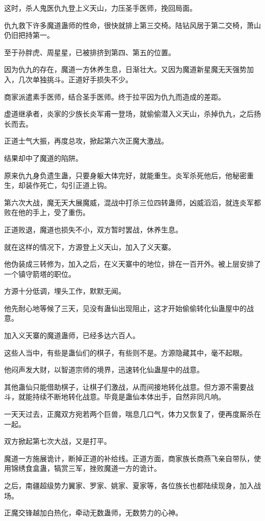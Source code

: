 \begin{this_body}
这时，杀人鬼医仇九登上义天山，力压圣手医师，挽回局面。

仇九救下许多魔道蛊师的性命，很快就排上第三交椅。陆钻风居于第二交椅，萧山仍旧把持第一。

至于孙胖虎、周星星，已被排挤到第四、第五的位置。

因为仇九的存在，魔道一方休养生息，日渐壮大。又因为魔道新星魔无天强势加入，几次单独挑斗。正道好手损失不少。

商家派遣素手医师，结合圣手医师。终于拉平因为仇九而造成的差距。

虚道继承者，炎家的少族长炎军甫一登场，就偷偷潜入义天山，杀掉仇九，之后扬长而去。

正道士气大振，再度总攻，掀起第六次正魔大激战。

结果却中了魔道的陷阱。

原来仇九身负遗生蛊，只要身躯大体完好，就能重生。炎军杀死他后，他秘密重生，却装作死亡，勾引正道上钩。

第六次大战，魔无天大展魔威，混战中打杀三位四转蛊师，凶威滔滔，就连炎军都败在他的手上，受了重伤。

正道败退，魔道也损失不小，双方暂时罢战，休养生息。

就在这样的情况下，方源登上义天山，加入了义天寨。

他伪装成三转修为，加入之后，在义天寨中的地位，排在一百开外。被上层安排了一个镇守箭塔的职位。

方源十分低调，埋头工作，默默无闻。

他先耐心地等候了三天，见没有蛊仙出现阻止，这才开始偷偷转化仙蛊屋中的战意。

加入义天寨的魔道蛊师，已经多达六百人。

这些人当中，有些是蛊仙们的棋子，有些则不是。方源隐藏其中，毫不起眼。

他闷声发大财，以智道宗师的境界，迅速转化仙蛊屋中的战意。

其他蛊仙只能借助棋子，让棋子们激战，从而间接地转化战意。但方源不需要战斗，就能持续不断地转化战意。毕竟是蛊仙本体出手，自然非同凡响。

一天天过去，正魔双方宛若两个巨兽，喘息几口气，体力又恢复了，便再度厮杀在一起。

双方掀起第七次大战，又是打平。

魔道一方施展诡计，断掉正道的补给线。正道方面，商家族长商燕飞亲自带队，使用锦绣食盒蛊，犒赏三军，挫败魔道一方的诡计。

之后，南疆超级势力翼家、罗家、姚家、夏家等，各位族长也都陆续现身，加入战场。

正魔交锋越加白热化，牵动无数蛊师，无数势力的心神。


\end{this_body}
